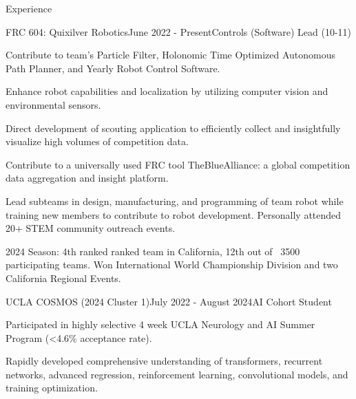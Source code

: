 \documentclass[
  11pt, %
]{src/resume/resume} %
\begin{document}

\begin{rSection}{Experience}


  \begin{rSubsection}{FRC 604: Quixilver Robotics}{June 2022 - Present}{Controls (Software) Lead (10-11)}{}
    
    \item Contribute to team's Particle Filter, Holonomic Time Optimized Autonomous Path Planner, and Yearly Robot Control Software.
    
    \item Enhance robot capabilities and localization by utilizing computer vision and environmental sensors.
    
    \item Direct development of scouting application to efficiently collect and insightfully visualize high volumes of competition data.
    
    \item Contribute to a universally used FRC tool TheBlueAlliance: a global competition data aggregation and insight platform.
    
    \item Lead subteams in design, manufacturing, and programming of team robot while training new members to contribute to robot development. Personally attended 20+ STEM community outreach events.
    
    \item 2024 Season: 4th ranked ranked team in California, 12th out of ~3500 participating teams. Won International World Championship Division and two California Regional Events.
    
  \end{rSubsection}
        
  \begin{rSubsection}{UCLA COSMOS (2024 Cluster 1)}{July 2022 - August 2024}{AI Cohort Student}{}
    
    \item Participated in highly selective 4 week UCLA Neurology and AI Summer Program (<4.6\% acceptance rate).
    
    \item Rapidly developed comprehensive understanding of transformers, recurrent networks, advanced regression, reinforcement learning, convolutional models, and training optimization.
    

\end{rSubsection}
\end{rSection}
\end{document}
